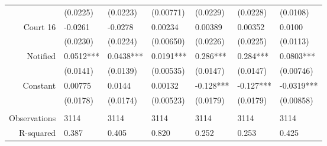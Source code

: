 \begin{tabular}{rrrrrrr}
      & \multicolumn{1}{l}{(0.0225)} & \multicolumn{1}{l}{(0.0223)} & \multicolumn{1}{l}{(0.00771)} & \multicolumn{1}{l}{(0.0229)} & \multicolumn{1}{l}{(0.0228)} & \multicolumn{1}{l}{(0.0108)} \\
Court 16 & \multicolumn{1}{l}{-0.0261} & \multicolumn{1}{l}{-0.0278} & \multicolumn{1}{l}{0.00234} & \multicolumn{1}{l}{0.00389} & \multicolumn{1}{l}{0.00352} & \multicolumn{1}{l}{0.0100} \\
      & \multicolumn{1}{l}{(0.0230)} & \multicolumn{1}{l}{(0.0224)} & \multicolumn{1}{l}{(0.00650)} & \multicolumn{1}{l}{(0.0226)} & \multicolumn{1}{l}{(0.0225)} & \multicolumn{1}{l}{(0.0113)} \\
Notified & \multicolumn{1}{l}{0.0512***} & \multicolumn{1}{l}{0.0438***} & \multicolumn{1}{l}{0.0191***} & \multicolumn{1}{l}{0.286***} & \multicolumn{1}{l}{0.284***} & \multicolumn{1}{l}{0.0803***} \\
      & \multicolumn{1}{l}{(0.0141)} & \multicolumn{1}{l}{(0.0139)} & \multicolumn{1}{l}{(0.00535)} & \multicolumn{1}{l}{(0.0147)} & \multicolumn{1}{l}{(0.0147)} & \multicolumn{1}{l}{(0.00746)} \\
Constant  & \multicolumn{1}{l}{0.00775} & \multicolumn{1}{l}{0.0144} & \multicolumn{1}{l}{0.00132} & \multicolumn{1}{l}{-0.128***} & \multicolumn{1}{l}{-0.127***} & \multicolumn{1}{l}{-0.0319***} \\
      & \multicolumn{1}{l}{(0.0178)} & \multicolumn{1}{l}{(0.0174)} & \multicolumn{1}{l}{(0.00523)} & \multicolumn{1}{l}{(0.0179)} & \multicolumn{1}{l}{(0.0179)} & \multicolumn{1}{l}{(0.00858)} \\
      & \multicolumn{1}{l}{} & \multicolumn{1}{l}{} & \multicolumn{1}{l}{} & \multicolumn{1}{l}{} & \multicolumn{1}{l}{} & \multicolumn{1}{l}{} \\
      \midrule
Observations & \multicolumn{1}{l}{3114} & \multicolumn{1}{l}{3114} & \multicolumn{1}{l}{3114} & \multicolumn{1}{l}{3114} & \multicolumn{1}{l}{3114} & \multicolumn{1}{l}{3114} \\
R-squared & \multicolumn{1}{l}{0.387} & \multicolumn{1}{l}{0.405} & \multicolumn{1}{l}{0.820} & \multicolumn{1}{l}{0.252} & \multicolumn{1}{l}{0.253} & \multicolumn{1}{l}{0.425} \\
\bottomrule
\end{tabular}%
